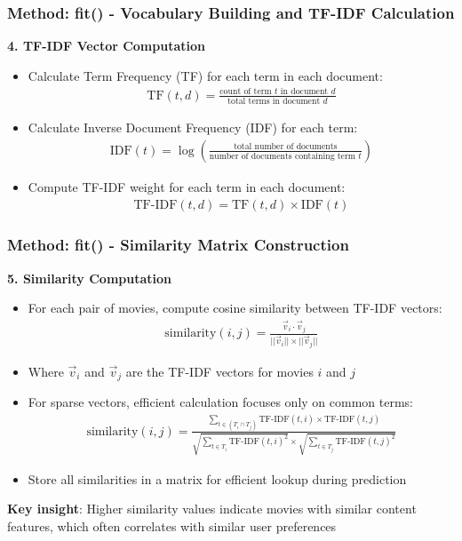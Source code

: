 \documentclass{beamer}
\begin{document}
\begin{frame}
\frametitle{Method: fit() - Vocabulary Building and TF-IDF Calculation}    
    \textbf{4. TF-IDF Vector Computation}
    \begin{itemize}
        \item Calculate Term Frequency (TF) for each term in each document:
        \begin{align*}
        \text{TF}(t,d) = \frac{\text{count of term $t$ in document $d$}}{\text{total terms in document $d$}}
        \end{align*}
        
        \item Calculate Inverse Document Frequency (IDF) for each term:
        \begin{align*}
        \text{IDF}(t) = \log\left(\frac{\text{total number of documents}}{\text{number of documents containing term $t$}}\right)
        \end{align*}
        
        \item Compute TF-IDF weight for each term in each document:
        \begin{align*}
        \text{TF-IDF}(t,d) = \text{TF}(t,d) \times \text{IDF}(t)
        \end{align*}
    \end{itemize}
\end{frame}

\begin{frame}
\frametitle{Method: fit() - Similarity Matrix Construction}
    \textbf{5. Similarity Computation}
    \begin{itemize}
        \item For each pair of movies, compute cosine similarity between TF-IDF vectors:
        \begin{align*}
        \text{similarity}(i,j) = \frac{\vec{v}_i \cdot \vec{v}_j}{||\vec{v}_i|| \times ||\vec{v}_j||}
        \end{align*}
        
        \item Where $\vec{v}_i$ and $\vec{v}_j$ are the TF-IDF vectors for movies $i$ and $j$
        
        \item For sparse vectors, efficient calculation focuses only on common terms:
        \begin{align*}
        \text{similarity}(i,j) = \frac{\sum_{t \in (T_i \cap T_j)} \text{TF-IDF}(t,i) \times \text{TF-IDF}(t,j)}{\sqrt{\sum_{t \in T_i} \text{TF-IDF}(t,i)^2} \times \sqrt{\sum_{t \in T_j} \text{TF-IDF}(t,j)^2}}
        \end{align*}
        
        \item Store all similarities in a matrix for efficient lookup during prediction
    \end{itemize}
    
    \textbf{Key insight}: Higher similarity values indicate movies with similar content features, which often correlates with similar user preferences
\end{frame}
\end{document}
